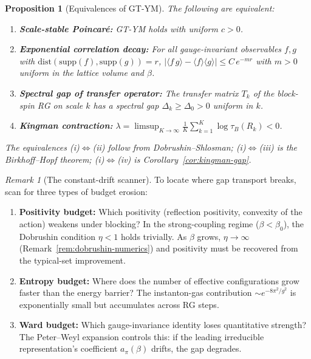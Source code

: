 \documentclass[12pt,a4paper]{article}
\theoremstyle{definition}
\theoremstyle{plain}
\newtheorem{proposition}[definition]{Proposition}
\theoremstyle{remark}
\newtheorem{remark}[definition]{Remark}
\begin{document}
\begin{proposition}[Equivalences of GT-YM]\label{prop:gt-equivalences}
The following are equivalent:
\begin{enumerate}
\item[(i)] \textbf{Scale-stable Poincar\'e:} GT-YM holds with uniform $c > 0$.
\item[(ii)] \textbf{Exponential correlation decay:} For all gauge-invariant observables $f, g$ with $\mathrm{dist}(\mathrm{supp}(f), \mathrm{supp}(g)) = r$,
  $|\langle f\, g \rangle - \langle f \rangle \langle g \rangle| \leq C\, e^{-m r}$
  with $m > 0$ uniform in the lattice volume and $\beta$.
\item[(iii)] \textbf{Spectral gap of transfer operator:} The transfer matrix $T_k$ of the block-spin RG on scale $k$ has a spectral gap $\Delta_k \geq \Delta_0 > 0$ uniform in $k$.
\item[(iv)] \textbf{Kingman contraction:} $\lambda = \limsup_{K \to \infty} \frac{1}{K} \sum_{k=1}^{K} \log \tau_B(R_k) < 0$.
\end{enumerate}
The equivalences (i)$\Leftrightarrow$(ii) follow from Dobrushin--Shlosman; (i)$\Leftrightarrow$(iii) is the Birkhoff--Hopf theorem; (i)$\Leftrightarrow$(iv) is Corollary~\ref{cor:kingman-gap}.
\end{proposition}

\begin{remark}[The constant-drift scanner]\label{rem:drift-scanner}
To locate where gap transport breaks, scan for three types of budget erosion:
\begin{enumerate}
\item \textbf{Positivity budget:} Which positivity (reflection positivity, convexity of the action) weakens under blocking? In the strong-coupling regime ($\beta < \beta_0$), the Dobrushin condition $\eta < 1$ holds trivially. As $\beta$ grows, $\eta \to \infty$ (Remark~\ref{rem:dobrushin-numerics}) and positivity must be recovered from the typical-set improvement.
\item \textbf{Entropy budget:} Where does the number of effective configurations grow faster than the energy barrier? The instanton-gas contribution $\sim e^{-8\pi^2/g^2}$ is exponentially small but accumulates across RG steps.
\item \textbf{Ward budget:} Which gauge-invariance identity loses quantitative strength? The Peter--Weyl expansion controls this: if the leading irreducible representation's coefficient $a_\pi(\beta)$ drifts, the gap degrades.
\end{enumerate}
\end{remark}
\end{document}

